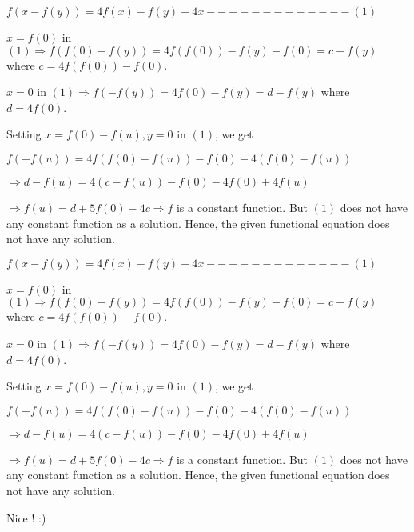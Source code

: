 \begin{solution}
	$ f(x - f(y)) = 4f(x) - f(y) -4x -------------(1)$

$ x = f(0)$ in $ (1) \Rightarrow f(f(0) - f(y)) = 4f(f(0)) - f(y) - f(0) = c - f(y)$ where $ c = 4f(f(0)) - f(0)$.

$ x = 0$ in $ (1) \Rightarrow f(- f(y)) = 4f(0) - f(y) = d - f(y)$ where $ d = 4f(0)$.

Setting $ x = f(0) - f(u), y = 0$ in $ (1)$, we get

$ f(-f(u)) = 4f(f(0) - f(u)) - f(0) -4(f(0) - f(u))$ 

$ \Rightarrow d - f(u) = 4(c - f(u)) -f(0) -4f(0) + 4f(u)$

$ \Rightarrow f(u) = d + 5f(0) -4c \Rightarrow f$ is a constant function.  But $ (1)$ does not have any constant function as a solution.
Hence, the given functional equation does not have any solution.
\end{solution}



\begin{solution}
	\begin{tcolorbox}$ f(x - f(y)) = 4f(x) - f(y) - 4x - - - - - - - - - - - - - (1)$

$ x = f(0)$ in $ (1) \Rightarrow f(f(0) - f(y)) = 4f(f(0)) - f(y) - f(0) = c - f(y)$ where $ c = 4f(f(0)) - f(0)$.

$ x = 0$ in $ (1) \Rightarrow f( - f(y)) = 4f(0) - f(y) = d - f(y)$ where $ d = 4f(0)$.

Setting $ x = f(0) - f(u), y = 0$ in $ (1)$, we get

$ f( - f(u)) = 4f(f(0) - f(u)) - f(0) - 4(f(0) - f(u))$ 

$ \Rightarrow d - f(u) = 4(c - f(u)) - f(0) - 4f(0) + 4f(u)$

$ \Rightarrow f(u) = d + 5f(0) - 4c \Rightarrow f$ is a constant function.  But $ (1)$ does not have any constant function as a solution.
Hence, the given functional equation does not have any solution.\end{tcolorbox}

Nice ! 
:)
\end{solution}



